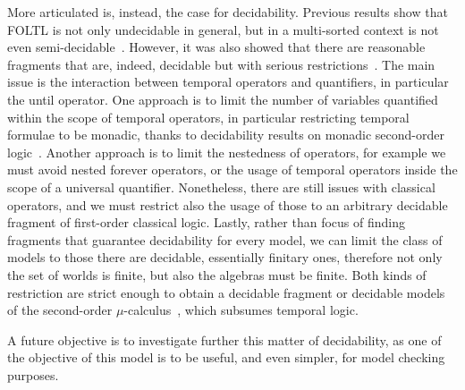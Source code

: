 More articulated is, instead, the case for decidability. Previous results show that \ac{FOLTL} is not only undecidable
in general, but in a multi-sorted context is not even semi-decidable~\cite{merz_decidability_1992}. However, it was
also showed that there are reasonable fragments that are, indeed, decidable but with serious
restrictions~\cite{hodkinson_decidable_2000,hodkinson_decidable_2002,goos_monodic_2001,peyras_decidable_2020,peyras_bounded_2019}.
The main issue is the interaction between temporal operators and quantifiers, in particular the until operator. One
approach is to limit the number of variables quantified within the scope of temporal operators, in particular
restricting temporal formulae to be monadic, thanks to decidability results on monadic second-order
logic~\cite{rozenberg_expression_1997}. Another approach is to limit the nestedness of operators, for example we must
avoid nested forever operators, or the usage of temporal operators inside the scope of a universal quantifier.
Nonetheless, there are still issues with classical operators, and we must restrict also the usage of those to an
arbitrary decidable fragment of first-order classical logic. Lastly, rather than focus of finding fragments that
guarantee decidability for every model, we can limit the class of models to those there are decidable, essentially
finitary ones, therefore not only the set of worlds is finite, but also the algebras must be finite. Both kinds of
restriction are strict enough to obtain a decidable fragment or decidable models of the second-order
$\mu$-calculus~\cite{hutchison_counterpart_2010}, which subsumes temporal logic.

A future objective is to investigate further this matter of decidability, as one of the objective of this model is to be
useful, and even simpler, for model checking purposes.
